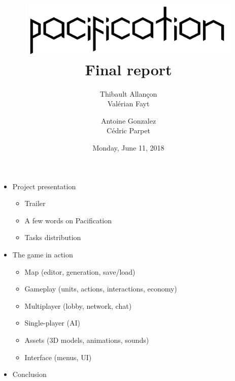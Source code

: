 \documentclass[14pt]{extarticle}
\title{
	{\protect\centering\protect\includegraphics[width=0.8\textwidth]{Pacification_logo}}\\
	{Final report}\\
}
\author{
	Thibault Allançon\\
	Valérian Fayt
	\and
	Antoine Gonzalez\\
	Cédric Parpet
}
\date{Monday, June 11, 2018}
\begin{document}
\maketitle

\begin{itemize}
    \item Project presentation
    \begin{itemize}
        \item Trailer
        \item A few words on Pacification
        \item Tasks distribution
    \end{itemize}

    \item The game in action
    \begin{itemize}
        \item Map (editor, generation, save/load)
        \item Gameplay (units, actions, interactions, economy)
        \item Multiplayer (lobby, network, chat)
        \item Single-player (AI)
        \item Assets (3D models, animations, sounds)
        \item Interface (menus, UI)
    \end{itemize}

    \item Conclusion
\end{itemize}
\end{document}
